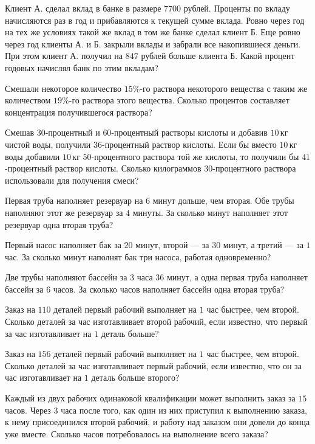 \begin{class}[number=6]
	\begin{listofex}
		\item Клиент А. сделал вклад в банке в размере \( 7700  \) рублей. Проценты по вкладу начисляются раз в год и прибавляются к текущей сумме вклада. Ровно через год на тех же условиях такой же вклад в том же банке сделал клиент Б. Еще ровно через год клиенты А. и Б. закрыли вклады и забрали все накопившиеся деньги. При этом клиент А. получил на \( 847  \) рублей больше клиента Б. Какой процент годовых начислял банк по этим вкладам?
		\item Смешали некоторое количество \( 15\% \)-го раствора некоторого вещества с таким же количеством \( 19\% \)-го раствора этого вещества. Сколько процентов составляет концентрация получившегося раствора?
		\item Смешав \( 30 \)-процентный и \( 60 \)-процентный растворы кислоты и добавив \( 10 \) кг чистой воды, получили \( 36 \)-процентный раствор кислоты. Если бы вместо \( 10 \) кг воды добавили \( 10 \) кг \( 50 \)-процентного раствора той же кислоты, то получили бы \( 41 \)-процентный раствор кислоты. Сколько килограммов \( 30 \)-процентного раствора использовали для получения смеси?
		\item Первая труба наполняет резервуар на \( 6 \) минут дольше, чем вторая. Обе трубы наполняют этот же резервуар за \( 4  \) минуты. За сколько минут наполняет этот резервуар одна вторая труба?
		\item Первый насос наполняет бак за \( 20  \) минут, второй --- за \( 30 \) минут, а третий --- за \( 1  \) час. За сколько минут наполнят бак три насоса, работая одновременно?
		\item Две трубы наполняют бассейн за \( 3 \) часа \( 36 \) минут, а одна первая труба наполняет бассейн за \( 6 \) часов. За сколько часов наполняет бассейн одна вторая труба?
		\item Заказ на \( 110 \) деталей первый рабочий выполняет на \( 1 \) час быстрее, чем второй. Сколько деталей за час изготавливает второй рабочий, если известно, что первый за час изготавливает на \( 1 \) деталь больше?
		\item Заказ на \( 156 \) деталей первый рабочий выполняет на \( 1 \) час быстрее, чем второй. Сколько деталей за час изготавливает первый рабочий, если известно, что он за час изготавливает на \( 1 \) деталь больше второго?
		\item Каждый из двух рабочих одинаковой квалификации может выполнить заказ за \( 15 \) часов. Через \( 3 \) часа после того, как один из них приступил к выполнению заказа, к нему присоединился второй рабочий, и работу над заказом они довели до конца уже вместе. Сколько часов потребовалось на выполнение всего заказа?

\end{listofex}
\end{class}
